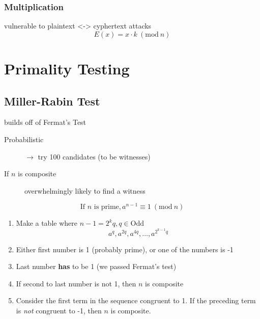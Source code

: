 \documentclass{article}
\newcommand{\Mod}[1]{\ (\mathrm{mod}\ #1)}
\begin{document}
\begin{multicols*}{2}
    \subsubsection*{Multiplication} vulnerable to plaintext <-> cyphertext attacks
    \begin{equation*}
        E(x) = x \cdot k \Mod{n}
    \end{equation*}
    \columnbreak
    \section*{Primality Testing}
    \subsection*{Miller-Rabin Test} builds off of Fermat's Test
    \begin{description}
        \item[Probabilistic] \(\rightarrow\) try 100 candidates (to be witnesses)
        \item[If \(n\) is composite] overwhelmingly likely to find a witness
    \end{description}
    \begin{equation*}
        \text{If } n \text{ is prime}, a^{n-1} \equiv 1 \Mod{n}
    \end{equation*}
    \begin{enumerate}
        \item Make a table where \(n-1 = 2^kq, q \in \text{Odd}\)
              \begin{equation*}
                  a^q, a^{2q}, a^{4q}, \ldots, a^{2^{k-1}q}
              \end{equation*}
        \item Either first number is 1 (probably prime), or one of the numbers
              is -1
        \item Last number \textbf{has} to be 1 (we passed Fermat's test)
        \item If second to last number is not 1, then \(n\) is composite
        \item Consider the first term in the sequence congruent to 1. If the
              preceding term is \textit{not} congruent to -1, then \(n\) is
              composite.
    \end{enumerate}
    \begin{multicols*}{2}
        \begin{minipage}{\columnwidth}
            \begin{align*}

\end{align*}
\end{minipage}
\end{multicols*}
\end{multicols*}
\end{document}
